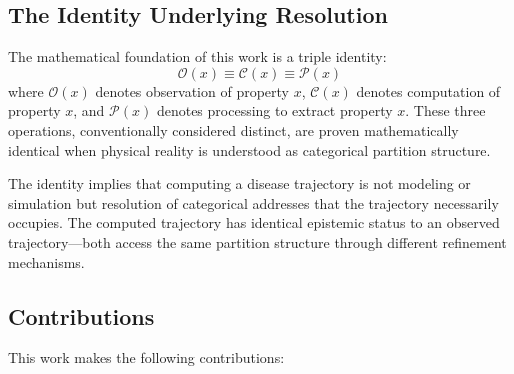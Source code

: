 \documentclass[10pt,twocolumn]{article}
\theoremstyle{plain}
\theoremstyle{definition}
\theoremstyle{remark}
\newcommand{\Obs}{\mathcal{O}}
\newcommand{\Comp}{\mathcal{C}}
\newcommand{\Proc}{\mathcal{P}}
\begin{document}
\subsection{The Identity Underlying Resolution}

The mathematical foundation of this work is a triple identity:
\begin{equation}
\Obs(x) \equiv \Comp(x) \equiv \Proc(x)
\label{eq:fundamental_identity}
\end{equation}
where $\Obs(x)$ denotes observation of property $x$, $\Comp(x)$ denotes computation of property $x$, and $\Proc(x)$ denotes processing to extract property $x$. These three operations, conventionally considered distinct, are proven mathematically identical when physical reality is understood as categorical partition structure.

The identity implies that computing a disease trajectory is not modeling or simulation but resolution of categorical addresses that the trajectory necessarily occupies. The computed trajectory has identical epistemic status to an observed trajectory---both access the same partition structure through different refinement mechanisms.

\subsection{Contributions}

This work makes the following contributions:
\end{document}
